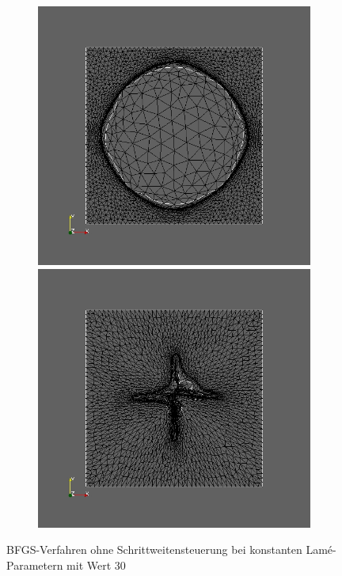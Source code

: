 \documentclass[bibliography=totoc,12pt,a4paper]{scrartcl}
\theoremstyle{exampstyle}
\numberwithin{equation}{section}
\begin{document}
\begin{figure}
\begin{subfigure}{0.3\textwidth}
	\caption{}	
	\end{subfigure}
	\begin{subfigure}{0.3\textwidth}
	\centering
	\includegraphics[scale=0.2]{pic_bigcircle_constlame5.jpg}
	\caption{}	
	\centering
	\includegraphics[scale=0.2]{pic_bigcircle_constlame6.jpg}
	\caption{}	
	\end{subfigure}
\caption{BFGS-Verfahren ohne Schrittweitensteuerung bei konstanten Lamé-Parametern mit Wert 30}
\label{Destroyedkonstlame}
\end{figure}
\end{document}
